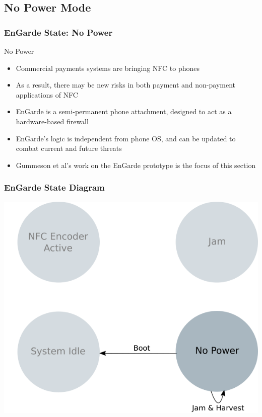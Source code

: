 \documentclass[unknownkeysallowed]{beamer}
\begin{document}
\subsection{No Power Mode}
\begin{frame}
\frametitle{EnGarde State: No Power}
  \begin{center}
  \begin{minipage}{.9\textwidth}
  \begin{block}{No Power}
    \begin{itemize}
      \item{Commercial payments systems are bringing NFC to phones}
      \pause
      \vspace{1mm}
      \item{As a result, there may be new risks in both payment and non-payment applications of NFC}
      \pause
      \vspace{1mm}
      \item{EnGarde is a semi-permanent phone attachment, designed to act as a hardware-based firewall}
      \pause
      \vspace{1mm}
      \item{EnGarde's logic is independent from phone OS, and can be updated to combat current and future threats}
      \pause
      \vspace{1mm}
      \item{Gummeson et al's work on the EnGarde prototype is the focus of this section}
    \end{itemize}
  \end{block}
  \end{minipage}
  \end{center}
\end{frame}



\begin{frame}
\frametitle{EnGarde State Diagram}
\begin{center}
  \includegraphics[width=.8\linewidth,height=.7\textheight,keepaspectratio]{figures/engarde/states2.png}
\end{center}
\end{frame}
\end{document}
